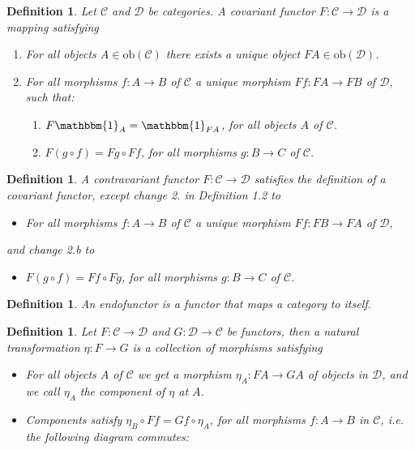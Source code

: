 \documentclass[11pt]{report}
\newcommand{\mcC}{\mathcal{C}}
\newcommand{\mcD}{\mathcal{D}}
\newcommand{\ob}{\text{ob}}
\newtheorem{defn}[thm]{Definition} %
\begin{document}
\begin{defn}
  Let $\mcC$ and $\mcD$ be categories. A covariant functor $F: \mcC \to \mcD$ is a mapping satisfying
  \begin{enumerate}
  \item For all objects $A \in \ob(\mcC)$ there exists a unique object $FA \in \ob(\mcD)$.
  \item For all morphisms $f:A \to B$ of $\mcC$ a unique morphism $Ff:FA \to FB$ of $\mcD$, such that:
    \begin{enumerate}
    \item $F\mathbbm{1}_A = \mathbbm{1}_{FA}$, for all objects $A$ of $\mcC$. \\
    \item $F(g \circ f) = Fg \circ Ff$, for all morphisms $g: B \to C$ of $\mcC$.
    \end{enumerate}
  \end{enumerate}
\end{defn}
\begin{defn}
  A contravariant functor $F: \mcC \to \mcD$ satisfies the definition of a covariant functor, except change 2. in Definition 1.2 to
  \begin{itemize}
    \item For all morphisms $f:A \to B$ of $\mcC$ a unique morphism $Ff:FB \to FA$ of $\mcD$,
  \end{itemize}
  and change 2.b to
  \begin{itemize}
    \item $F(g \circ f) = Ff \circ Fg$, for all morphisms $g: B \to C$ of $\mcC$.
  \end{itemize}
\end{defn}

\begin{defn}
  An endofunctor is a functor that maps a category to itself. 
\end{defn}

\begin{defn}
  Let $F: \mcC \to \mcD$ and $G: \mcD \to \mcC$ be functors, then a natural transformation $\eta: F \to G$ is a collection of morphisms satisfying
  \begin{itemize}
    \item For all objects $A$ of $\mcC$ we get a morphism $\eta_A: FA \to GA$ of objects in $\mcD$, and we call $\eta_A$ the component of $\eta$ at $A$. \\
    \item Components satisfy $\eta_B \circ Ff = Gf \circ \eta_A$, for all morphisms $f: A \to B$ in $\mcC$,
      i.e. the following diagram commutes:
      \begin{center}
      \end{center}

  \end{itemize}
\end{defn}
\end{document}
